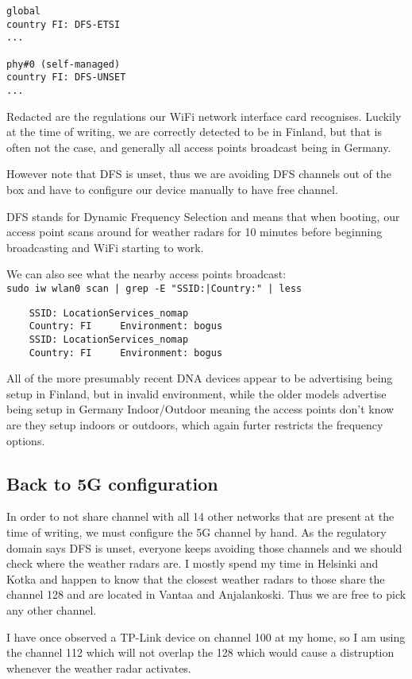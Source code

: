 \documentclass[../wifi-security.tex]{subfiles}
\begin{document}
\begin{verbatim}
global
country FI: DFS-ETSI
...

phy#0 (self-managed)
country FI: DFS-UNSET
...
\end{verbatim}

Redacted are the regulations our WiFi network interface card recognises. Luckily at the time of writing, we are correctly detected to be in Finland, but that is often not the case, and generally all access points broadcast being in Germany.

However note that DFS is unset, thus we are avoiding DFS channels out of the box and have to configure our device manually to have free channel.

DFS stands for Dynamic Frequency Selection and means that when booting, our access point scans around for weather radars for 10 minutes before beginning broadcasting and WiFi starting to work.

We can also see what the nearby access points broadcast:\\ \texttt{sudo iw wlan0 scan | grep -E "SSID:|Country:" | less}

\begin{verbatim}
	SSID: LocationServices_nomap
	Country: FI     Environment: bogus
	SSID: LocationServices_nomap
	Country: FI     Environment: bogus
\end{verbatim}

All of the more presumably recent DNA devices appear to be advertising being setup in Finland, but in invalid environment, while the older models advertise being setup in Germany Indoor/Outdoor meaning the access points don't know are they setup indoors or outdoors, which again furter restricts the frequency options.

\subsection{Back to 5G configuration}

In order to not share channel with all 14 other networks that are present at the time of writing, we must configure the 5G channel by hand. As the regulatory domain says DFS is unset, everyone keeps avoiding those channels and we should check where the weather radars are. I mostly spend my time in Helsinki and Kotka and happen to know that the closest weather radars to those share the channel 128 and are located in Vantaa and Anjalankoski. Thus we are free to pick any other channel.

I have once observed a TP-Link device on channel 100 at my home, so I am using the channel 112 which will not overlap the 128 which would cause a distruption whenever the weather radar activates.
\end{document}
